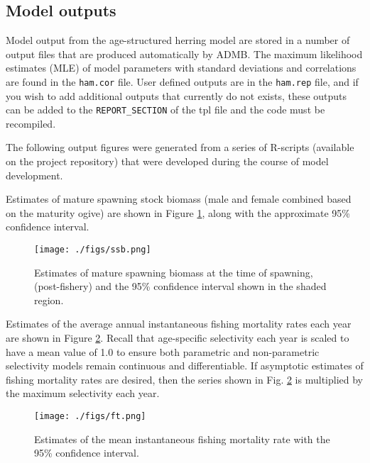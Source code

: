 \documentclass[12pt,letterpaper]{article}
\begin{document}
  \clearpage














  \subsection{Model outputs} %
  \label{sub:model_outputs}

  Model output from the age-structured herring model are stored in a number of output files that are produced automatically by ADMB. The maximum likelihood estimates (MLE) of model parameters with standard deviations and correlations are found in the \texttt{ham.cor} file. User defined outputs are in the \texttt{ham.rep} file, and if you wish to add additional outputs that currently do not exists, these outputs can be added to the \texttt{REPORT\_SECTION} of the tpl file and the code must be recompiled.  

  The following output figures were generated from a series of R-scripts (available on the project repository) that were developed during the course of model development.

  Estimates of mature spawning stock biomass (male and female combined based on the maturity ogive) are shown in Figure \ref{fig:ssb}, along with the approximate 95\% confidence interval.


  
  \begin{figure}[tb]
    \centering
    \texttt{[image: ./figs/ssb.png]}
    \caption{Estimates of mature spawning biomass at the time of spawning, (post-fishery) and the 95\% confidence interval shown in the shaded region.}
    \label{fig:ssb}
  \end{figure}

  Estimates of the average annual instantaneous fishing mortality rates each year are shown in Figure \ref{fig:ft}.  Recall that age-specific selectivity each year is scaled to have a mean value of 1.0 to ensure both parametric and non-parametric selectivity models remain continuous and differentiable.  If asymptotic estimates of fishing mortality rates are desired, then the series shown in Fig. \ref{fig:ft} is multiplied by the maximum selectivity each year.  

  \begin{figure}[tb]
    \centering
    \texttt{[image: ./figs/ft.png]}
    \caption{Estimates of the mean instantaneous fishing mortality rate with the 95\% confidence interval.}
    \label{fig:ft}
  \end{figure}
\end{document}
